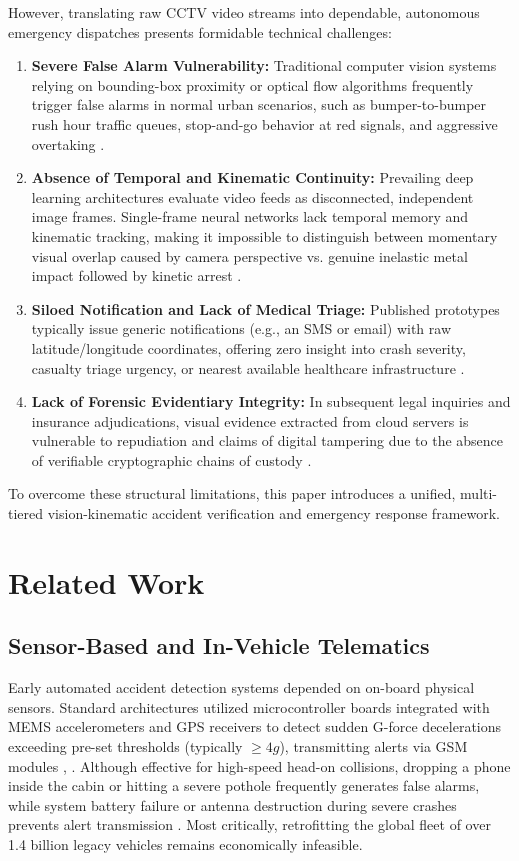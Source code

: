 \documentclass[conference]{IEEEtran}
\begin{document}
However, translating raw CCTV video streams into dependable, autonomous emergency dispatches presents formidable technical challenges:
\begin{enumerate}
    \item \textbf{Severe False Alarm Vulnerability:} Traditional computer vision systems relying on bounding-box proximity or optical flow algorithms frequently trigger false alarms in normal urban scenarios, such as bumper-to-bumper rush hour traffic queues, stop-and-go behavior at red signals, and aggressive overtaking \cite{sharma2021automated}.
    \item \textbf{Absence of Temporal and Kinematic Continuity:} Prevailing deep learning architectures evaluate video feeds as disconnected, independent image frames. Single-frame neural networks lack temporal memory and kinematic tracking, making it impossible to distinguish between momentary visual overlap caused by camera perspective vs. genuine inelastic metal impact followed by kinetic arrest \cite{yao2019unsupervised}.
    \item \textbf{Siloed Notification and Lack of Medical Triage:} Published prototypes typically issue generic notifications (e.g., an SMS or email) with raw latitude/longitude coordinates, offering zero insight into crash severity, casualty triage urgency, or nearest available healthcare infrastructure \cite{shah2024accisense}.
    \item \textbf{Lack of Forensic Evidentiary Integrity:} In subsequent legal inquiries and insurance adjudications, visual evidence extracted from cloud servers is vulnerable to repudiation and claims of digital tampering due to the absence of verifiable cryptographic chains of custody \cite{conti2018iot}.
\end{enumerate}

To overcome these structural limitations, this paper introduces a unified, multi-tiered vision-kinematic accident verification and emergency response framework.

\section{Related Work}

\subsection{Sensor-Based and In-Vehicle Telematics}
Early automated accident detection systems depended on on-board physical sensors. Standard architectures utilized microcontroller boards integrated with MEMS accelerometers and GPS receivers to detect sudden G-force decelerations exceeding pre-set thresholds (typically $\ge 4g$), transmitting alerts via GSM modules \cite{white2011wreckwatch}, \cite{sengar2022ai}. Although effective for high-speed head-on collisions, dropping a phone inside the cabin or hitting a severe pothole frequently generates false alarms, while system battery failure or antenna destruction during severe crashes prevents alert transmission \cite{fernandez2020road}. Most critically, retrofitting the global fleet of over 1.4 billion legacy vehicles remains economically infeasible.
\end{document}
